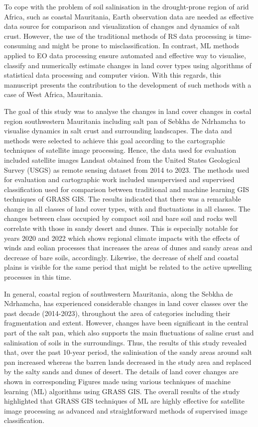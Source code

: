 \documentclass[12pt,a4paper,oneside]{article}
\def \newpar{\vspace{6pt}}
\begin{document}
\newpar To cope with the problem of soil salinisation in the drought-prone region of arid Africa, such as coastal Mauritania, Earth observation data are needed as effective data source for comparison and visualization of changes and dynamics of salt crust. However, the use of the traditional methods of RS data processing is time-consuming and might be prone to misclassification. In contrast, ML methods applied to EO data processing ensure automated and effective way to visualise, classify and numerically estimate changes in land cover types using algorithms of statistical data processing and computer vision. With this regards, this manuscript presents the contribution to the development of such methods with a case of West Africa, Mauritania.

\newpar The goal of this study was to analyse the changes in land cover changes in costal region southwestern Mauritania including salt pan of Sebkha de Ndrhamcha to visualise dynamics in salt crust and surrounding landscapes. The data and methods were selected to achieve this goal according to the cartographic techniques of satellite image processing. Hence, the data used for evaluation included satellite images Landsat obtained from the United States Geological Survey (USGS) as remote sensing dataset from 2014 to 2023. The methods used for evaluation and cartographic work included unsupervised and supervised classification used for comparison between traditional and machine learning GIS techniques of GRASS GIS. The results indicated that there was a remarkable change in all classes of land cover types, with and fluctuations in all classes. The changes between class occupied by compact soil and bare soil and rocks well correlate with those in sandy desert and dunes. This is especially notable for years 2020 and 2022 which shows regional climate impacts with the effects of winds and eolian processes that increases the areas of dunes and sandy areas and decrease of bare soils, accordingly. Likewise, the decrease of shelf and coastal plains is visible for the same period that might be related to the active upwelling processes in this time.

\newpar In general, coastal region of southwestern Mauritania, along the Sebkha de Ndrhamcha, has experienced considerable changes in land cover classes over the past decade (2014-2023), throughout the area of categories including their fragmentation and extent. However, changes have been significant in the central part of the salt pan, which also supports the main fluctuations of saline crust and salinisation of soils in the surroundings. Thus, the results of this study revealed that, over the past 10-year period, the salinisation of the sandy areas around salt pan increased whereas the barren lands decreased in the study area and replaced by the salty sands and dunes of desert. The details of land cover changes are shown in corresponding Figures made using various techniques of machine learning (ML) algorithms using GRASS GIS. The overall results of the study highlighted that GRASS GIS techniques of ML are highly effective for satellite image processing as advanced and straightforward methods of supervised image classification. 
\end{document}
